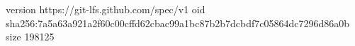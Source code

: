 version https://git-lfs.github.com/spec/v1
oid sha256:7a5a63a921a2f60c00cffd62cbac99a1bc87b2b7dcbdf7c05864dc7296d86a0b
size 198125
